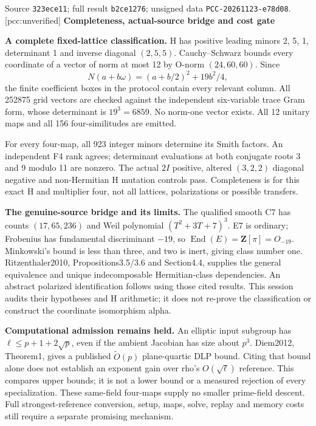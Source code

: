 \documentclass[10pt,a4paper]{article}
\begin{document}
Source \texttt{323ece11}; full result \texttt{b2ce1276};
unsigned data \texttt{PCC-20261123-e78d08}. [pcc:unverified]
\newpage
{\Large\bfseries Completeness, actual-source bridge and cost gate}\par

\textbf{A complete fixed-lattice classification.}
H has positive leading minors 2, 5, 1, determinant 1 and inverse diagonal
$(2,5,5)$. Cauchy--Schwarz bounds every coordinate of a vector of norm
at most 12 by O-norm $(24,60,60)$. Since
\[
 N(a+b\omega)=(a+b/2)^2+19b^2/4,
\]
the finite coefficient boxes in the protocol contain every relevant column.
All 252875 grid vectors are checked against the independent six-variable
trace Gram form, whose determinant is $19^3=6859$. No norm-one vector
exists. All 12 unitary maps and all 156 four-similitudes are emitted.

For every four-map, all 923 integer minors determine its Smith factors.
An independent F4 rank agrees; determinant evaluations at both conjugate
roots 3 and 9 modulo 11 are nonzero. The actual $2I$ positive, altered
$(3,2,2)$ diagonal negative and non-Hermitian H mutation controls pass.
Completeness is for this exact H and multiplier four, not all lattices,
polarizations or possible transfers.

\textbf{The genuine-source bridge and its limits.}
The qualified smooth C7 has counts $(17,65,236)$ and Weil polynomial
$(T^2+3T+7)^3$. E7 is ordinary; Frobenius has fundamental discriminant
$-19$, so $\operatorname{End}(E)=\mathbf Z[\pi]=O_{-19}$.
Minkowski's bound is less than three, and two is inert, giving class number
one. Ritzenthaler2010, Propositions3.5/3.6 and Section4.4, supplies the
general equivalence and unique indecomposable Hermitian-class dependencies.
An abstract polarized identification follows using those cited results.
This session audits their hypotheses and H arithmetic; it does not re-prove
the classification or construct the coordinate isomorphism alpha.

\textbf{Computational admission remains held.}
An elliptic input subgroup has $\ell\le p+1+2\sqrt p$, even if the ambient
Jacobian has size about $p^3$. Diem2012, Theorem1, gives a published
$\widetilde O(p)$ plane-quartic DLP bound. Citing that bound alone does
not establish an exponent gain over rho's $O(\sqrt\ell)$ reference.
This compares upper bounds; it is not a lower bound or a measured rejection
of every specialization. These same-field four-maps supply no smaller
prime-field descent. Full strongest-reference conversion, setup, maps,
solve, replay and memory costs still require a separate promising mechanism.
\end{document}
